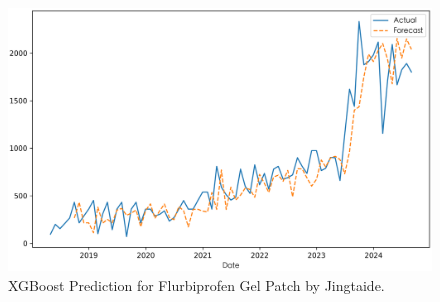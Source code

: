 \documentclass[journal]{IEEEtran}
\begin{document}
\begin{itemize}
\begin{figure}[H]
\includegraphics[width=\linewidth]{../Result_Paper/XGBoost_Prediction_麦考酚钠肠溶片_瑞士诺华.png}
\caption{XGBoost Prediction for Flurbiprofen Gel Patch by Jingtaide.}
\label{fig:flurbiprofen}
\end{figure}
\end{itemize}
\end{document}
